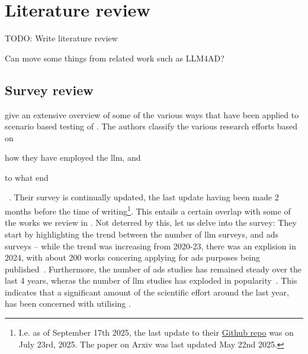 \chapter{Literature review}

TODO: Write literature review

Can move some things from related work such as LLM4AD?

\section{Survey review}

\citeauthor{surveyLLMScenarioBasedTesting} give an extensive overview of some of the various ways
that  have been applied to scenario based testing of .
The authors classify the various research efforts based on \begin{inparaenum}
    \item how they have employed the \acrshort{llm}, and
    \item to what end
\end{inparaenum}~\cite{surveyLLMScenarioBasedTesting}.
Their survey is continually updated, the last update having been made 2 months before the time of
writing\footnote{I.e. as of September 17th 2025, the last update to their
    \href{https://github.com/ftgTUGraz/LLM4ADSTest}{Github repo} was on July 23rd, 2025. The paper on
    Arxiv was last updated May 22nd 2025.}. This entails a certain overlap with some of the works we
review in .
Not deterred by this, let us delve into the survey:
They start by highlighting the trend between the number of \acrshort{llm} surveys, and
\acrshort{ads} surveys -- while the trend was increasing from 2020-23, there was an explision in
\num{2024}, with about \num{200} works concering applying  for \acrlong{ads}
purposes being published~\cite[p. 1, figure (b)]{surveyLLMScenarioBasedTesting}. Furthermore, the
number of \acrshort{ads} studies has remained steady over the last \num{4}  years, wheras the number
of \acrshort{llm} studies has exploded in popularity~\cite[p. 1, figure
    (a)]{surveyLLMScenarioBasedTesting}. This indicates that a significant amount of the scientific
effort around  the last year, has been concerned with utilising .

